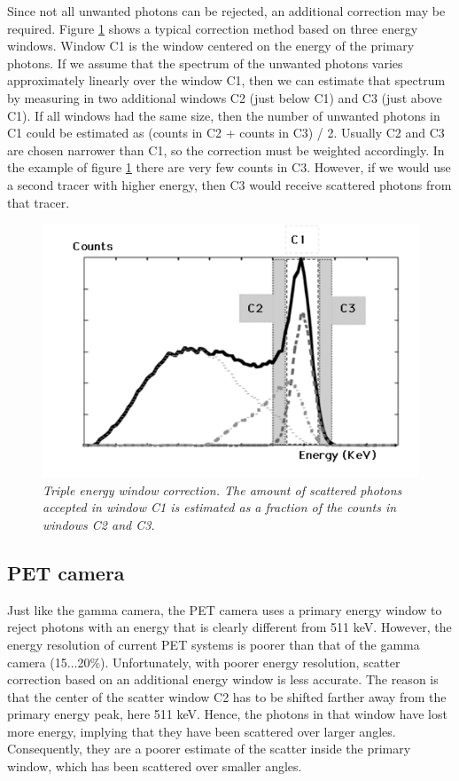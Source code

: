 Since not all unwanted photons can be rejected, an additional correction may
be required. Figure \ref{fig:TEW_scatter} shows a typical correction method
based on three energy windows. Window C1 is the window centered on the energy
of the primary photons. If we assume that the spectrum of the unwanted photons
varies approximately linearly over the window C1, then we can estimate that
spectrum by measuring in two additional windows C2 (just below C1) and C3
(just above C1). If all windows had the same size, then the number of unwanted
photons in C1 could be estimated as (counts in C2 + counts in C3) / 2. Usually
C2 and C3 are chosen narrower than C1, so the correction must be weighted
accordingly. In the example of figure \ref{fig:TEW_scatter} there are very few
counts in C3. However, if we would use a second tracer with higher energy,
then C3 would receive scattered photons from that tracer.

\begin{figure}[tb]
\centering
\includegraphics[width=\figone]{figs/fig_TEW_scatter.pdf}
\caption{\label{fig:TEW_scatter} \emph{Triple energy window correction. The
amount of scattered photons accepted in window C1 is estimated as a fraction
of the counts in windows C2 and C3.}}
\end{figure}

\subsection{PET camera \label{sec:petscatcor}}
Just like the gamma camera, the PET camera uses a primary energy
window to reject photons with an energy that is clearly different from
511 keV. However, the energy resolution of current PET systems is
poorer than that of the gamma camera (15$\ldots$20\%). Unfortunately,
with poorer energy resolution, scatter correction based on an
additional energy window is less accurate. The reason is that the
center of the scatter window C2 has to be shifted farther away from
the primary energy peak, here 511 keV. Hence, the photons in that
window have lost more energy, implying that they have been scattered
over larger angles. Consequently, they are a poorer estimate of the
scatter inside the primary window, which has been scattered over
smaller angles.


